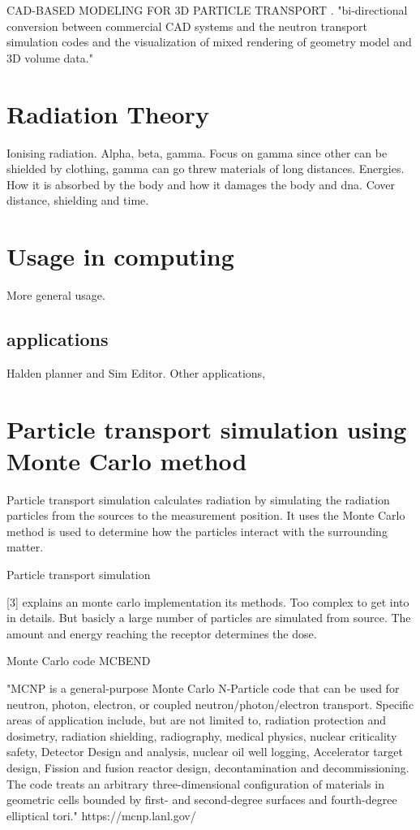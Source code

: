 \documentclass[11pt,twoside,a4paper]{report}
\begin{document}
CAD-BASED MODELING FOR 3D PARTICLE TRANSPORT \cite{wu2009cad}. "bi-directional conversion between commercial CAD systems and the neutron transport simulation codes and the visualization of mixed rendering of geometry model and 3D volume data."

\section{Radiation Theory}
Ionising radiation. Alpha, beta, gamma. Focus on gamma since other can be shielded by clothing, gamma can go threw materials of long distances. Energies. How it is absorbed by the body and how it damages the body and dna. Cover distance, shielding and time.

\section{Usage in computing}
More general usage.

\subsection{applications}
Halden planner and Sim Editor. Other applications,

\section{Particle transport simulation using Monte Carlo method}

Particle transport simulation calculates radiation by simulating the radiation particles from the sources to the measurement position. It uses the Monte Carlo method \cite{wiki:monte_carlo_method} is used to determine how the particles interact with the surrounding matter.




Particle transport simulation

[3] explains an monte carlo implementation its methods. Too complex to get into in details. But basicly a large number of particles are simulated from source. The amount and energy reaching the receptor determines the dose.

Monte Carlo code MCBEND

"MCNP is a general-purpose Monte Carlo N-Particle code that can be used for neutron, photon, electron, or coupled neutron/photon/electron transport. Specific areas of application include, but are not limited to, radiation protection and dosimetry, radiation shielding, radiography, medical physics, nuclear criticality safety, Detector Design and analysis, nuclear oil well logging, Accelerator target design, Fission and fusion reactor design, decontamination and decommissioning. The code treats an arbitrary three-dimensional configuration of materials in geometric cells bounded by first- and second-degree surfaces and fourth-degree elliptical tori."
https://mcnp.lanl.gov/
\end{document}
